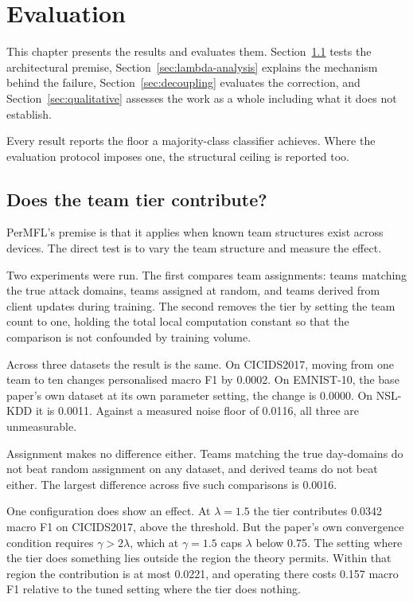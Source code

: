 \chapter{Evaluation}
\label{chap:evaluation}

This chapter presents the results and evaluates them. Section~\ref{sec:tier}
tests the architectural premise, Section~\ref{sec:lambda-analysis} explains the
mechanism behind the failure, Section~\ref{sec:decoupling} evaluates the
correction, and Section~\ref{sec:qualitative} assesses the work as a whole
including what it does not establish.

Every result reports the floor a majority-class classifier achieves. Where the
evaluation protocol imposes one, the structural ceiling is reported too.

\section{Does the team tier contribute?}
\label{sec:tier}

PerMFL's premise is that it applies when known team structures exist across
devices. The direct test is to vary the team structure and measure the effect.

Two experiments were run. The first compares team assignments: teams matching
the true attack domains, teams assigned at random, and teams derived from client
updates during training. The second removes the tier by setting the team count
to one, holding the total local computation constant so that the comparison is
not confounded by training volume.

Across three datasets the result is the same. On CICIDS2017, moving from one
team to ten changes personalised macro F1 by 0.0002. On EMNIST-10, the base
paper's own dataset at its own parameter setting, the change is 0.0000. On
NSL-KDD it is 0.0011. Against a measured noise floor of 0.0116, all three are
unmeasurable.

Assignment makes no difference either. Teams matching the true day-domains do
not beat random assignment on any dataset, and derived teams do not beat either.
The largest difference across five such comparisons is 0.0016.

One configuration does show an effect. At $\lambda = 1.5$ the tier contributes
0.0342 macro F1 on CICIDS2017, above the threshold. But the paper's own
convergence condition requires $\gamma > 2\lambda$, which at $\gamma = 1.5$
caps $\lambda$ below 0.75. The setting where the tier does something lies
outside the region the theory permits. Within that region the contribution is
at most 0.0221, and operating there costs 0.157 macro F1 relative to the tuned
setting where the tier does nothing.

